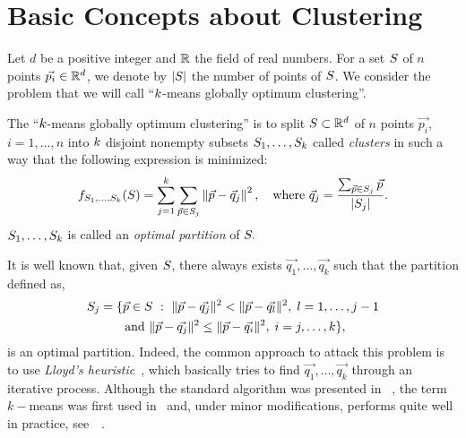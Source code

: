 \documentclass{article}
\begin{document}
\section{Basic Concepts about Clustering}
\label{sec:BasicConceptsClustering}
Let $d$ be a positive integer and $\mathbb{R}$ the field of real numbers.
For a set $S$ of $n$ points $\vec{p_i}\in \mathbb{R}^d$, we denote by
$|S|$ the number of points of $S$. We consider the problem that
we will call  ``$k$-means globally optimum clustering''.
\begin{definition}
  The ``$k$-means globally optimum clustering'' is to split  
  $S\subset\mathbb{R}^{d}$ of $n$ points $\vec{p_i}$, $i=1,\ldots, n$ into
  $k$ disjoint 
  nonempty subsets $S_1,\ldots, S_{k}$ called \textit{clusters}
  in such a way that the following expression is minimized:
  \begin{equation*}
    f_{S_1,\ldots,S_{k}}(S)=\sum_{j=1}^k \sum_{\vec{p} \in S_j}
    \left\|\vec{p}-\vec{q}_j\right\|^2,\quad\text{where }
    \vec{q}_j = \frac{\sum_{\vec{p} \in S_j} \vec{p}}{|S_j|}.
  \end{equation*}
  $S_1,\ldots, S_{k}$ is called an \textit{optimal partition}
  of $S.$
\end{definition}
It is well known that, given $S$, there always exists
$\vec{q_1},\ldots, \vec{q_k}$ such that the partition defined as,
\begin{multline*}
  \Set_j=\{\vec{p}\in\Set\ :\ 
  \|\vec{p}-\vec{q_j}\|^2< \|\vec{p}-\vec{q_l}\|^2,\; l =1,\ldots, j-1\\
  \text{ and }
  \|\vec{p}-\vec{q_j}\|^2\le \|\vec{p}-\vec{q_i}\|^2,\; i =j,\ldots, k \},
\end{multline*}
is an optimal partition.
Indeed, the common approach to attack this problem is to use 
\textit{Lloyd's heuristic}~\cite{Lloy82}, which basically tries to find 
$\vec{q_1},\ldots, \vec{q_k}$ through an iterative process.
Although the standard algorithm was presented in ~\cite{Lloy82},
the term $k-$means was first used in~\cite{MacQ67}  and, under minor
modifications, performs quite well in practice, see~~\cite{arthurVas07,ZhangXia09}.
\end{document}
